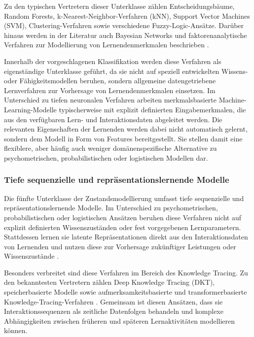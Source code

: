 Zu den typischen Vertretern dieser Unterklasse zählen
Entscheidungsbäume, Random Forests, k-Nearest-Neighbor-Verfahren (kNN),
Support Vector Machines (SVM), Clustering-Verfahren sowie verschiedene
Fuzzy-Logic-Ansätze. Darüber hinaus werden in der Literatur auch
Bayesian Networks und faktorenanalytische Verfahren zur Modellierung von
Lernendenmerkmalen beschrieben \citep{Wang2025, Orji2022}.

Innerhalb der vorgeschlagenen Klassifikation werden diese Verfahren als
eigenständige Unterklasse geführt, da sie nicht auf speziell
entwickelten Wissens- oder Fähigkeitsmodellen beruhen, sondern
allgemeine datengetriebene Lernverfahren zur Vorhersage von
Lernendenmerkmalen einsetzen. Im Unterschied zu tiefen neuronalen
Verfahren arbeiten merkmalsbasierte Machine-Learning-Modelle
typischerweise mit explizit definierten Eingabemerkmalen, die aus den
verfügbaren Lern- und Interaktionsdaten abgeleitet werden. Die
relevanten Eigenschaften der Lernenden werden dabei nicht automatisch
gelernt, sondern dem Modell in Form von Features bereitgestellt. Sie
stellen damit eine flexiblere, aber häufig auch weniger
domänenspezifische Alternative zu psychometrischen, probabilistischen
oder logistischen Modellen dar.

\subsubsection{Tiefe sequenzielle und repräsentationslernende
Modelle}\label{tiefe-sequenzielle-und-repruxe4sentationslernende-modelle}

Die fünfte Unterklasse der Zustandsmodellierung umfasst tiefe
sequenzielle und repräsentationslernende Modelle. Im Unterschied zu
psychometrischen, probabilistischen oder logistischen Ansätzen beruhen
diese Verfahren nicht auf explizit definierten Wissenszuständen oder
fest vorgegebenen Lernparametern. Stattdessen lernen sie latente
Repräsentationen direkt aus den Interaktionsdaten von Lernenden und
nutzen diese zur Vorhersage zukünftiger Leistungen oder Wissenszustände
\citep{Shen2024}.

Besonders verbreitet sind diese Verfahren im Bereich des Knowledge
Tracing. Zu den bekanntesten Vertretern zählen Deep Knowledge Tracing
(DKT), speicherbasierte Modelle sowie aufmerksamkeitsbasierte und
transformerbasierte Knowledge-Tracing-Verfahren \citep{Shen2024}.
Gemeinsam ist diesen Ansätzen, dass sie Interaktionssequenzen als
zeitliche Datenfolgen behandeln und komplexe Abhängigkeiten zwischen
früheren und späteren Lernaktivitäten modellieren können.


